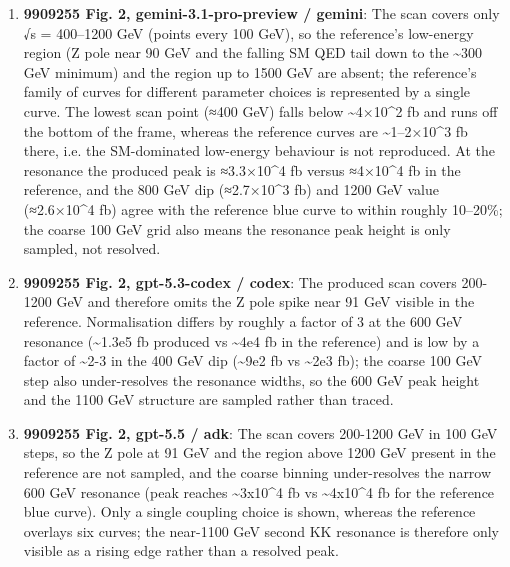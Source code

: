 \begin{enumerate}
\item \textbf{9909255 Fig. 2, gemini-3.1-pro-preview / gemini}: The scan covers only √s = 400–1200 GeV (points every 100 GeV), so the reference's low-energy region (Z pole near 90 GeV and the falling SM QED tail down to the \textasciitilde{}300 GeV minimum) and the region up to 1500 GeV are absent; the reference's family of curves for different parameter choices is represented by a single curve. The lowest scan point (≈400 GeV) falls below \textasciitilde{}4×10\textasciicircum{}2 fb and runs off the bottom of the frame, whereas the reference curves are \textasciitilde{}1–2×10\textasciicircum{}3 fb there, i.e. the SM-dominated low-energy behaviour is not reproduced. At the resonance the produced peak is ≈3.3×10\textasciicircum{}4 fb versus ≈4×10\textasciicircum{}4 fb in the reference, and the 800 GeV dip (≈2.7×10\textasciicircum{}3 fb) and 1200 GeV value (≈2.6×10\textasciicircum{}4 fb) agree with the reference blue curve to within roughly 10–20\%; the coarse 100 GeV grid also means the resonance peak height is only sampled, not resolved.
\item \textbf{9909255 Fig. 2, gpt-5.3-codex / codex}: The produced scan covers 200-1200 GeV and therefore omits the Z pole spike near 91 GeV visible in the reference. Normalisation differs by roughly a factor of 3 at the 600 GeV resonance (\textasciitilde{}1.3e5 fb produced vs \textasciitilde{}4e4 fb in the reference) and is low by a factor of \textasciitilde{}2-3 in the 400 GeV dip (\textasciitilde{}9e2 fb vs \textasciitilde{}2e3 fb); the coarse 100 GeV step also under-resolves the resonance widths, so the 600 GeV peak height and the 1100 GeV structure are sampled rather than traced.
\item \textbf{9909255 Fig. 2, gpt-5.5 / adk}: The scan covers 200-1200 GeV in 100 GeV steps, so the Z pole at 91 GeV and the region above 1200 GeV present in the reference are not sampled, and the coarse binning under-resolves the narrow 600 GeV resonance (peak reaches \textasciitilde{}3x10\textasciicircum{}4 fb vs \textasciitilde{}4x10\textasciicircum{}4 fb for the reference blue curve). Only a single coupling choice is shown, whereas the reference overlays six curves; the near-1100 GeV second KK resonance is therefore only visible as a rising edge rather than a resolved peak.
\end{enumerate}
